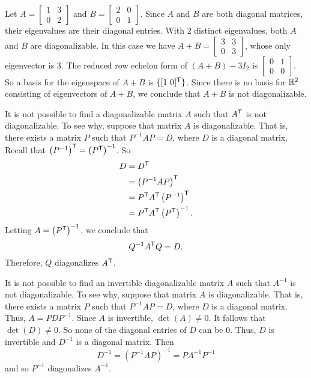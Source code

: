 \begin{example}
\item Let $A = \left[ \begin{array}{cc} 1&3\\0&2 \end{array} \right]$ and $B = \left[ \begin{array}{rr} 2&0 \\ 0&1 \end{array} \right]$. Since $A$ and $B$ are both diagonal matrices, their eigenvalues are their diagonal entries. With $2$ distinct eigenvalues, both $A$ and $B$ are diagonalizable. In this case we have $A+B = \left[ \begin{array}{cc} 3&3\\0&3 \end{array} \right]$, whose only eigenvector is $3$. The reduced row echelon form of $(A+B) - 3I_2$ is $\left[ \begin{array}{cc} 0&1\\0&0 \end{array} \right]$. So a basis for the eigenspace of $A+B$ is $\{[1 \ 0]^{\mathsf{T}}\}$. Since there is no basis for $\mathbb{R}^2$ consisting of eigenvectors of $A+B$, we conclude that $A+B$ is not diagonalizable.

\item It is not possible to find a diagonalizable matrix $A$ such that $A^{\mathsf{T}}$ is not diagonalizable. To see why, suppose that matrix $A$ is diagonalizable. That is, there exists a matrix $P$ such that $P^{-1}AP = D$, where $D$ is a diagonal matrix. Recall that $\left(P^{-1}\right)^{\mathsf{T}} = \left(P^{\mathsf{T}}\right)^{-1}$. So 
\begin{align*}
D &= D^{\mathsf{T}} \\
	&= \left(P^{-1}AP\right)^{\mathsf{T}} \\
	&= P^{\mathsf{T}}A^{\mathsf{T}}\left(P^{-1}\right)^{\mathsf{T}}  \\
	&= P^{\mathsf{T}}A^{\mathsf{T}}\left(P^{\mathsf{T}}\right)^{-1}.
\end{align*}
Letting $A = \left(P^{\mathsf{T}}\right)^{-1}$, we conclude that 
\[Q^{-1}A^{\mathsf{T}}Q = D.\]
Therefore, $Q$ diagonalizes $A^{\mathsf{T}}$. 

\item It is not possible to find an invertible diagonalizable matrix $A$ such that $A^{-1}$ is not diagonalizable. To see why, suppose that matrix $A$ is diagonalizable. That is, there exists a matrix $P$ such that $P^{-1}AP = D$, where $D$ is a diagonal matrix. Thus, $A = PDP^{-1}$. Since $A$ is invertible, $\det(A) \neq 0$. It follows that $\det(D) \neq 0$. So none of the diagonal entries of $D$ can be $0$. Thus, $D$ is invertible and $D^{-1}$ is a diagonal matrix. Then
\[D^{-1} = \left(P^{-1}AP\right)^{-1} = PA^{-1}P^{-1}\]
and so $P^{-1}$ diagonalizes $A^{-1}$. 
\ea

\end{example}

